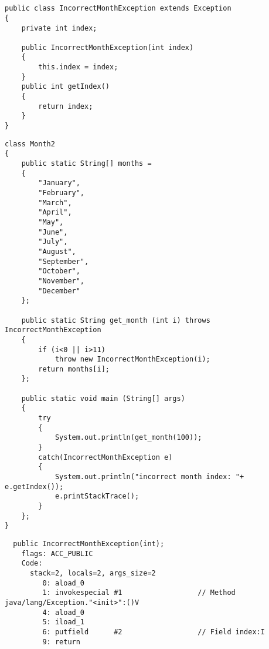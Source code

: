 \section{}


\begin{lstlisting}[caption=IncorrectMonthException.java]
public class IncorrectMonthException extends Exception
{
	private int index;

	public IncorrectMonthException(int index)
	{
		this.index = index;
	} 
	public int getIndex()
	{
		return index;
	}
}
\end{lstlisting}

\begin{lstlisting}[caption=Month2.java]
class Month2
{
	public static String[] months = 
	{
		"January", 
		"February", 
		"March", 
		"April",
		"May",
		"June",
		"July",
		"August",
		"September",
		"October",
		"November",
		"December"
	};

	public static String get_month (int i) throws IncorrectMonthException
	{
		if (i<0 || i>11)
			throw new IncorrectMonthException(i);
		return months[i];
	};

	public static void main (String[] args)
	{
		try
		{
			System.out.println(get_month(100));
		}
		catch(IncorrectMonthException e)
		{
			System.out.println("incorrect month index: "+ e.getIndex());
			e.printStackTrace();
		}
	};
}
\end{lstlisting}



\begin{lstlisting}
  public IncorrectMonthException(int);
    flags: ACC_PUBLIC
    Code:
      stack=2, locals=2, args_size=2
         0: aload_0       
         1: invokespecial #1                  // Method java/lang/Exception."<init>":()V
         4: aload_0       
         5: iload_1       
         6: putfield      #2                  // Field index:I
         9: return        
\end{lstlisting}

